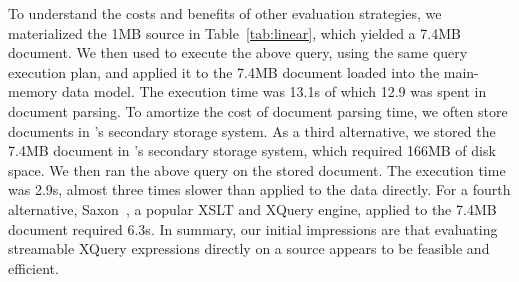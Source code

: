 To understand the costs and benefits of other evaluation strategies,
we materialized the 1MB \pads{} source in Table~\ref{tab:linear},
which yielded a 7.4MB \Xml{} document.  We then used \Galax{} to
execute the above query, using the same query execution plan, and
applied it to the 7.4MB \Xml{} document loaded into the main-memory
data model.  The execution time was 13.1s of which 12.9 was spent in
document parsing.  To amortize the cost of document parsing time, we
often store documents in \Galax{}'s secondary storage system.  As a
third alternative, we stored the 7.4MB \Xml{} document in \Galax{}'s
secondary storage system, which required 166MB of disk space.  We then
ran the above query on the stored document.  The execution time was
2.9s, almost three times slower than \padx{} applied to the \pads{}
data directly.  For a fourth alternative, Saxon~\cite{saxon}, a
popular XSLT and XQuery engine, applied to the 7.4MB document required
6.3s.  In summary, our initial impressions are that evaluating
streamable XQuery expressions directly on a \pads{} source appears to
be feasible and efficient.


